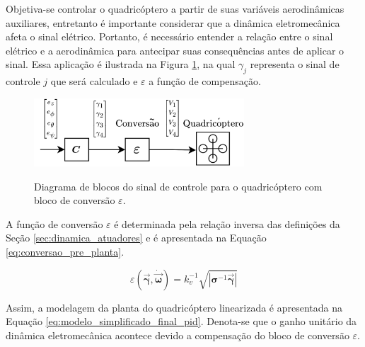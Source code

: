 \documentclass[main.tex]{subfiles}
\begin{document}
	Objetiva-se controlar o quadricóptero a partir de suas variáveis aerodinâmicas auxiliares, entretanto é importante considerar que a dinâmica eletromecânica afeta o sinal elétrico. Portanto, é necessário entender a relação entre o sinal elétrico e a aerodinâmica para antecipar suas consequências antes de aplicar o sinal. Essa aplicação é ilustrada na Figura \ref{fig:diagrama_sinal_quadricoptero}, na qual $\gamma_j$ representa o sinal de controle $j$ que será calculado e $\varepsilon$ a função de compensação.
	
	\begin{figure}[!h]
		\centering
		\caption{Diagrama de blocos do sinal de controle para o quadricóptero com bloco de conversão $\varepsilon$.}
		\includegraphics[width=0.7\textwidth]{capitulos/controle_atitude/imgs/diagrama_sinal_quadricoptero.png}
		\label{fig:diagrama_sinal_quadricoptero}
	\end{figure}
	
	A função de conversão $\varepsilon$ é determinada pela relação inversa das definições da Seção \ref{sec:dinamica_atuadores} e é apresentada na Equação \ref{eq:conversao_pre_planta}.
	
	\begin{equation}\label{eq:conversao_pre_planta}
		\varepsilon\left(\boldsymbol{\vec{\gamma}}, \boldsymbol{\dot{\vec{\omega}}}\right) = k_v^{-1} \sqrt{|\boldsymbol{\sigma}^{-1}\boldsymbol{\vec{\gamma}}|}
	\end{equation}
	
	Assim, a modelagem da planta do quadricóptero linearizada é apresentada na Equação \ref{eq:modelo_simplificado_final_pid}. Denota-se que o ganho unitário da dinâmica eletromecânica acontece devido a compensação do bloco de conversão $\varepsilon$.
	
\end{document}
